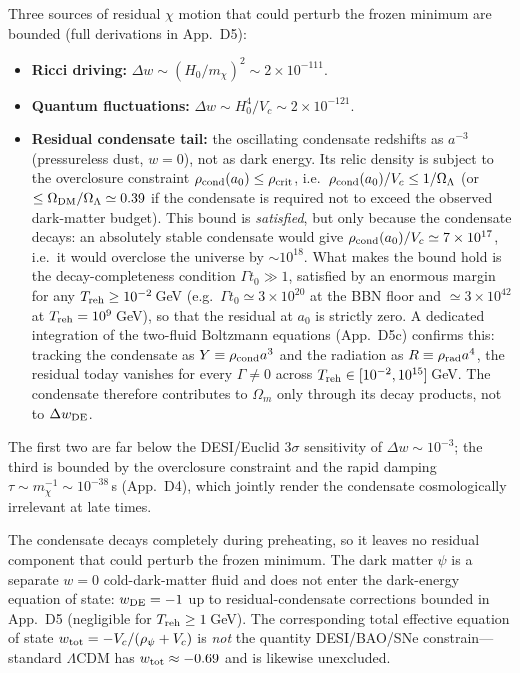 \documentclass[pdflatex,sn-mathphys-num]{sn-jnl}
\providecommand{\gtrsim}{\geq}
\theoremstyle{thmstyleone}
\begin{document}
Three sources of residual $\chi$ motion that could perturb the frozen minimum are bounded (full derivations in App.~D5):
\begin{itemize}
\item \textbf{Ricci driving:} $\Delta w\sim(H_0/m_\chi)^2\sim2\times10^{-111}$.
\item \textbf{Quantum fluctuations:} $\Delta w\sim H_0^4/V_c\sim2\times10^{-121}$.
\item \textbf{Residual condensate tail:} the oscillating condensate redshifts as $a^{-3}$ (pressureless dust, $w=0$), not as dark energy. Its relic density is subject to the overclosure constraint $\rho_{\rm cond}(a_0)\leq\rho_{\rm crit}$, i.e.\ $\rho_{\rm cond}(a_0)/V_c\leq1/\Omega_\Lambda$ (or $\leq\Omega_{\rm DM}/\Omega_\Lambda\simeq0.39$ if the condensate is required not to exceed the observed dark-matter budget). This bound is \emph{satisfied}, but only because the condensate decays: an absolutely stable condensate would give $\rho_{\rm cond}(a_0)/V_c\simeq7\times10^{17}$, i.e.\ it would overclose the universe by $\sim10^{18}$. What makes the bound hold is the decay-completeness condition $\Gamma t_0\gg1$, satisfied by an enormous margin for any $T_{\rm reh}\gtrsim10^{-2}\,$GeV (e.g.\ $\Gamma t_0\simeq3\times10^{20}$ at the BBN floor and $\simeq3\times10^{42}$ at $T_{\rm reh}=10^9\,$GeV), so that the residual at $a_0$ is strictly zero. A dedicated integration of the two-fluid Boltzmann equations (App.~D5c) confirms this: tracking the condensate as $Y\equiv\rho_{\rm cond}a^3$ and the radiation as $R\equiv\rho_{\rm rad}a^4$, the residual today vanishes for every $\Gamma\neq0$ across $T_{\rm reh}\in[10^{-2},10^{15}]\,$GeV. The condensate therefore contributes to $\Omega_m$ only through its decay products, not to $\Delta w_{\rm DE}$.
\end{itemize}
The first two are far below the DESI/Euclid $3\sigma$ sensitivity of $\Delta w\sim10^{-3}$; the third is bounded by the overclosure constraint and the rapid damping $\tau\sim m_\chi^{-1}\sim10^{-38}\,$s (App.~D4), which jointly render the condensate cosmologically irrelevant at late times.

The condensate decays completely during preheating, so it leaves no residual component that could perturb the frozen minimum. The dark matter $\psi$ is a separate $w=0$ cold-dark-matter fluid and does not enter the dark-energy equation of state: $w_{\rm DE}=-1$ up to residual-condensate corrections bounded in App.~D5 (negligible for $T_{\rm reh}\geq1\,$GeV). The corresponding total effective equation of state $w_{\rm tot}=-V_c/(\rho_\psi+V_c)$ is \emph{not} the quantity DESI/BAO/SNe constrain---standard $\Lambda$CDM has $w_{\rm tot}\approx-0.69$ and is likewise unexcluded.
\end{document}
